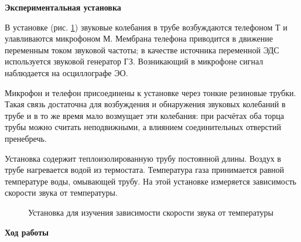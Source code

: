 \documentclass[a4paper, 12pt]{article}
\begin{document}
    \begin{flushleft}
        {\Large {\bf Экспериментальная установка}}
    \end{flushleft}
    
    В установке (рис. \ref{pic1}) звуковые колебания в трубе возбуждаются телефоном Т и улавливаются микрофоном М. Мембрана телефона приводится в движение переменным током звуковой частоты; в качестве источника переменной ЭДС используется звуковой генератор ГЗ. Возникающий в микрофоне сигнал наблюдается на осциллографе ЭО.
    
    Микрофон и телефон присоединены к установке через тонкие резиновые трубки. Такая связь достаточна для возбуждения и обнаружения звуковых колебаний в трубе и в то же время мало возмущает эти колебания: при расчётах оба торца трубы можно считать неподвижными, а влиянием соединительных отверстий пренебречь.
    
    Установка содержит теплоизолированную трубу постоянной длины. Воздух в трубе нагревается водой из термостата. Температура газа принимается равной температуре воды, омывающей трубу. На этой установке измеряется зависимость скорости звука от температуры.\\
    
    \begin{figure}[ht]
        \caption{Установка для изучения зависимости скорости звука от температуры}
        \label{pic1}
    \end{figure}
    
    \begin{flushleft}
        {\Large {\bf Ход работы}}
    \end{flushleft}
    
\end{document}
